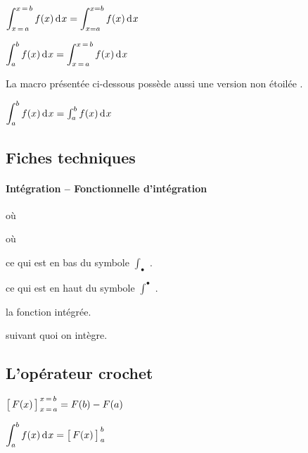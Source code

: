 \documentclass[12pt,a4paper]{article}
\begin{document}
\begin{latexex}
 $\displaystyle
  \integrate{a}{b}{f(x)}{x}
= \int_{x=a}^{x=b} f(x) \dd{x}$

 $\displaystyle
  \integrate*{a}{b}{f(x)}{x}
= \integrate{a}{b}{f(x)}{x}$
\end{latexex}



La macro  présentée ci-dessous possède aussi une version non étoilée .

\begin{latexex}
 $\dintegrate*{a}{b}{f(x)}{x}
= \integrate*{a}{b}{f(x)}{x}$
\end{latexex}




\subsection{Fiches techniques}

\paragraph{Intégration -- Fonctionnelle d'intégration}



\extraspace

   où \quad {}

  où \quad {}

 ce qui est en bas du symbole $\int_{\bullet}$ .

 ce qui est en haut du symbole $\int^{\bullet}$ .

 la fonction intégrée.

 suivant quoi on intègre.




\subsection{L'opérateur crochet}

\newparaexample{}

\begin{latexex}
 $\hook{a}{b}{F(x)}{x}
= F(b) - F(a)$

 $\dintegrate*{a}{b}{f(x)}{x}
= \hook*{a}{b}{F(x)}{x}$

\end{latexex}
\end{document}
